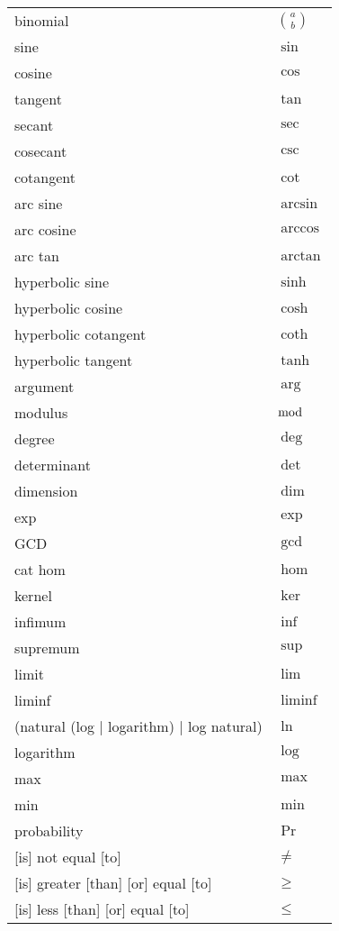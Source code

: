 \documentclass[12pt, a4paper]{article}
\begin{document}
\begin{longtable}{ll}
binomial & $\binom{a}{b}$ \\
sine & $\sin$ \\
cosine & $\cos$ \\
tangent & $\tan$ \\
secant & $\sec$ \\
cosecant & $\csc$ \\
cotangent & $\cot$ \\
arc sine & $\arcsin$ \\
arc cosine & $\arccos$ \\
arc tan & $\arctan$ \\
hyperbolic sine & $\sinh$ \\
hyperbolic cosine & $\cosh$ \\
hyperbolic cotangent & $\coth$ \\
hyperbolic tangent & $\tanh$ \\
argument & $\arg$ \\
modulus & $\bmod$ \\
degree & $\deg$ \\
determinant & $\det$ \\
dimension & $\dim$ \\
exp & $\exp$ \\
GCD & $\gcd$ \\
cat hom & $\hom$ \\
kernel & $\ker$ \\
infimum & $\inf$ \\
supremum & $\sup$ \\
limit & $\lim$ \\
liminf & $\liminf$ \\
(natural (log | logarithm) | log natural) & $\ln$ \\
logarithm & $\log$ \\
max & $\max$ \\
min & $\min$ \\
probability & $\Pr$ \\
{[is]} not equal [to] & $\neq$ \\
{[is]} greater [than] [or] equal [to] & $\geq$ \\
{[is]} less [than] [or] equal [to] & $\leq$ \\

\end{longtable}
\end{document}
